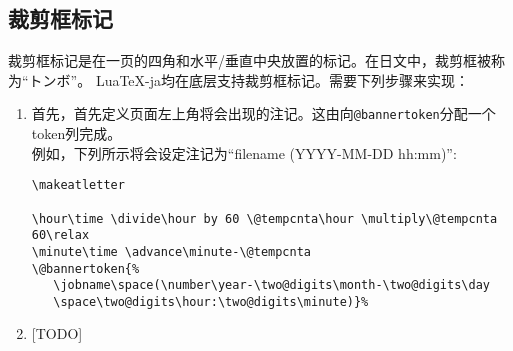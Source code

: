 \documentclass{ltjarticle}
\def\LuaTeX{Lua\TeX}
\def\pLaTeX{p\LaTeX}
\begin{document}
\subsection{裁剪框标记}
裁剪框标记是在一页的四角和水平/垂直中央放置的标记。在日文中，裁剪框被称为“トンボ”。
\LuaTeX-ja均在底层支持裁剪框标记。需要下列步骤来实现：
\begin{enumerate}
\item 首先，首先定义页面左上角将会出现的注记。这由向\verb!@bannertoken!分配一个token列完成。\\
例如，下列所示将会设定注记为“\textsf{filename (YYYY-MM-DD hh:mm)}”:

\begin{verbatim}
\makeatletter

\hour\time \divide\hour by 60 \@tempcnta\hour \multiply\@tempcnta 60\relax
\minute\time \advance\minute-\@tempcnta
\@bannertoken{%
   \jobname\space(\number\year-\two@digits\month-\two@digits\day
   \space\two@digits\hour:\two@digits\minute)}%
\end{verbatim}

\item {[TODO]}
\end{enumerate}
\end{document}

